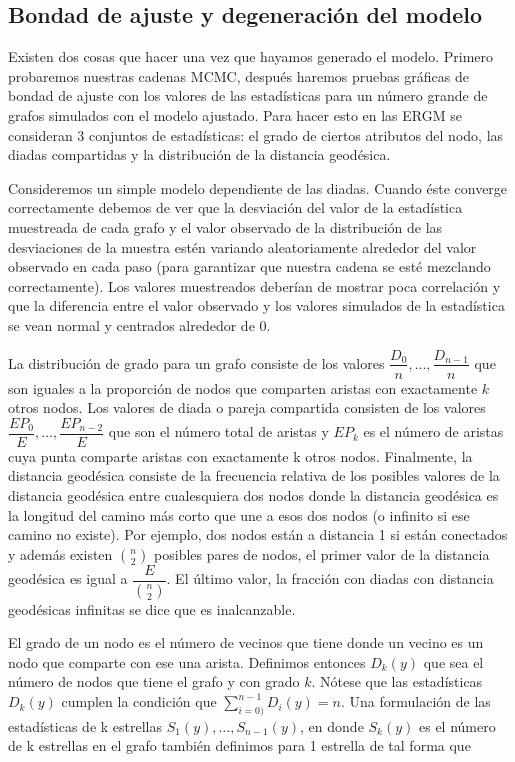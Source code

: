 \subsection{Bondad de ajuste y degeneración del modelo}

Existen dos cosas que hacer una vez que hayamos generado el modelo. Primero probaremos nuestras cadenas MCMC, después haremos pruebas gráficas de bondad de ajuste con los valores de las estadísticas para un número grande de grafos simulados con el modelo ajustado. Para hacer esto en las ERGM se consideran 3 conjuntos de estadísticas: el grado de ciertos atributos del nodo, las diadas compartidas y la distribución de la distancia geodésica.


Consideremos un simple modelo dependiente de las diadas. Cuando éste converge correctamente debemos de ver que la desviación del valor de la estadística muestreada de cada grafo y el valor observado de la distribución de las desviaciones de la muestra estén variando aleatoriamente alrededor del valor observado en cada paso (para garantizar que nuestra cadena se esté mezclando correctamente). Los valores muestreados deberían de mostrar poca correlación y que la diferencia entre el valor observado y los valores simulados de la estadística se vean normal y centrados alrededor de 0. 

La distribución de grado para un grafo consiste de los valores $\dfrac{D_0}{n}
,...,\dfrac{D_{n - 1}}{n}$ que son iguales a la proporción de nodos que comparten aristas con exactamente $k$ otros nodos. Los valores de diada o pareja compartida consisten de los valores $\dfrac{EP_0}{E},...,\dfrac{EP_{n-2}}{E}$ que son el número total de aristas y $EP_k$ es el número de aristas cuya punta comparte aristas con exactamente k otros nodos. Finalmente, la distancia geodésica consiste de la frecuencia relativa de los posibles valores de la distancia geodésica entre cualesquiera dos nodos donde la distancia geodésica es la longitud del camino más corto que une a esos dos nodos (o infinito si ese camino no existe). Por ejemplo, dos nodos están a distancia 1 si están conectados y además existen $n \choose 2$ posibles pares de nodos, el primer valor de la distancia geodésica es igual a $\dfrac{E}{{n \choose 2}} $. El último valor, la fracción con diadas con distancia geodésicas infinitas se dice que es inalcanzable.

El grado de un nodo es el número de vecinos que tiene donde un vecino es un nodo que comparte con ese una arista. Definimos entonces $D_k(y)$ que sea el número de nodos que tiene el grafo y con grado $k$. Nótese que las estadísticas $D_k(y)$ cumplen la condición que $\sum_{i=0)}^{n-1}D_i(y) = n$. Una formulación de las estadísticas de k estrellas $S_1(y),\ldots,S_{n-1}(y)$, en donde $S_k(y)$ es el número de k estrellas en el grafo también definimos para 1 estrella de tal forma que

